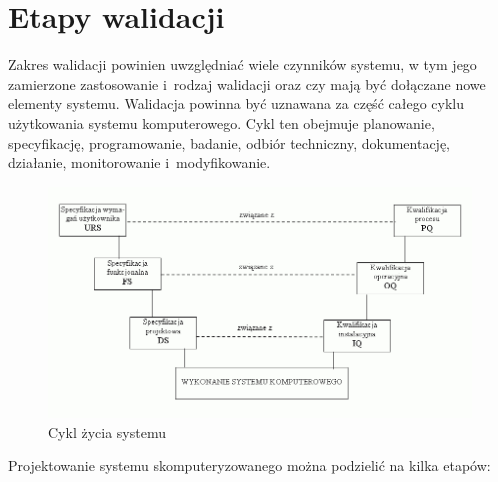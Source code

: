 \documentclass[brudnopis]{xmgr}
\begin{document}
\section{Etapy walidacji}
\indent \indent \indent \textcolor{sb}{Zakres walidacji powinien uwzględniać wiele czynników systemu,} \textcolor{sa}{w tym jego zamierzone zastosowanie i~rodzaj walidacji oraz czy mają być dołączane nowe elementy systemu.} \textcolor{sb}{Walidacja powinna być uznawana za część całego cyklu użytkowania systemu komputerowego.} \textcolor{sa}{Cykl ten obejmuje planowanie, specyfikację, programowanie, badanie, odbiór techniczny, dokumentację, działanie, monitorowanie i~modyfikowanie.}

\begin{figure}[th!]
\centering
\includegraphics[width=.7\hsize]{images/cykl}
\caption{Cykl życia systemu\label{RYS.3}}
\end{figure}

\textcolor{sb}{Projektowanie systemu skomputeryzowanego można podzielić na kilka etapów:}
\end{document}
